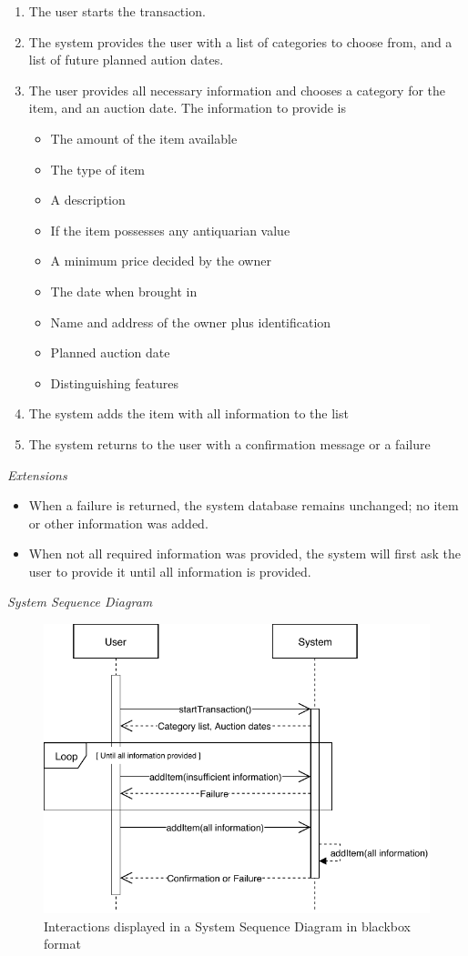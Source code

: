 \documentclass{article}
\begin{document}
\begin{enumerate}[noitemsep]
	\item The user starts the transaction.
	\item The system provides the user with a list of categories to choose from, and a list of future planned aution dates.
	\item The user provides all necessary information and chooses a category for the item, and an auction date. The information to provide is
	\begin{itemize}[noitemsep]
		\item The amount of the item available
		\item The type of item
		\item A description
		\item If the item possesses any antiquarian value
		\item A minimum price decided by the owner
		\item The date when brought in
		\item Name and address of the owner plus identification
		\item Planned auction date
		\item Distinguishing features
	\end{itemize}
	\item The system adds the item with all information to the list
	\item The system returns to the user with a confirmation message or a failure
\end{enumerate}
\textsl{Extensions}
\begin{itemize}[noitemsep]
	\item When a failure is returned, the system database remains unchanged; no item or other information was added.
	\item When not all required information was provided, the system will first ask the user to provide it until all information is provided.
\end{itemize}
\textsl{System Sequence Diagram}
\begin{figure}[H]
	\centering
	\includegraphics[scale=1]{SD-bb-create.pdf}
	\caption*{Interactions displayed in a System Sequence Diagram in blackbox format}
\end{figure}
\end{document}
